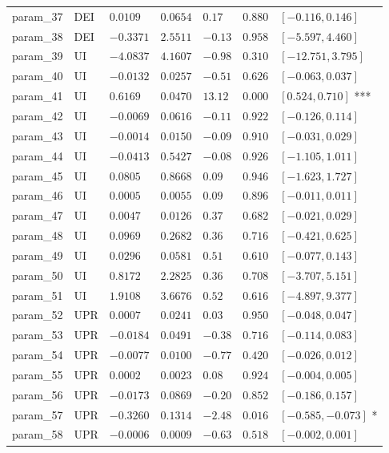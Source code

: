 \documentclass{article}
\begin{document}
\begin{longtable}{lllllll}
param\_37 & DEI & $0.0109$ & $0.0654$ & $0.17$ & $0.880$ & $[-0.116, 0.146]$  \\
param\_38 & DEI & $-0.3371$ & $2.5511$ & $-0.13$ & $0.958$ & $[-5.597, 4.460]$  \\
param\_39 & UI & $-4.0837$ & $4.1607$ & $-0.98$ & $0.310$ & $[-12.751, 3.795]$  \\
param\_40 & UI & $-0.0132$ & $0.0257$ & $-0.51$ & $0.626$ & $[-0.063, 0.037]$  \\
param\_41 & UI & $0.6169$ & $0.0470$ & $13.12$ & $0.000$ & $[0.524, 0.710]$ *** \\
param\_42 & UI & $-0.0069$ & $0.0616$ & $-0.11$ & $0.922$ & $[-0.126, 0.114]$  \\
param\_43 & UI & $-0.0014$ & $0.0150$ & $-0.09$ & $0.910$ & $[-0.031, 0.029]$  \\
param\_44 & UI & $-0.0413$ & $0.5427$ & $-0.08$ & $0.926$ & $[-1.105, 1.011]$  \\
param\_45 & UI & $0.0805$ & $0.8668$ & $0.09$ & $0.946$ & $[-1.623, 1.727]$  \\
param\_46 & UI & $0.0005$ & $0.0055$ & $0.09$ & $0.896$ & $[-0.011, 0.011]$  \\
param\_47 & UI & $0.0047$ & $0.0126$ & $0.37$ & $0.682$ & $[-0.021, 0.029]$  \\
param\_48 & UI & $0.0969$ & $0.2682$ & $0.36$ & $0.716$ & $[-0.421, 0.625]$  \\
param\_49 & UI & $0.0296$ & $0.0581$ & $0.51$ & $0.610$ & $[-0.077, 0.143]$  \\
param\_50 & UI & $0.8172$ & $2.2825$ & $0.36$ & $0.708$ & $[-3.707, 5.151]$  \\
param\_51 & UI & $1.9108$ & $3.6676$ & $0.52$ & $0.616$ & $[-4.897, 9.377]$  \\
param\_52 & UPR & $0.0007$ & $0.0241$ & $0.03$ & $0.950$ & $[-0.048, 0.047]$  \\
param\_53 & UPR & $-0.0184$ & $0.0491$ & $-0.38$ & $0.716$ & $[-0.114, 0.083]$  \\
param\_54 & UPR & $-0.0077$ & $0.0100$ & $-0.77$ & $0.420$ & $[-0.026, 0.012]$  \\
param\_55 & UPR & $0.0002$ & $0.0023$ & $0.08$ & $0.924$ & $[-0.004, 0.005]$  \\
param\_56 & UPR & $-0.0173$ & $0.0869$ & $-0.20$ & $0.852$ & $[-0.186, 0.157]$  \\
param\_57 & UPR & $-0.3260$ & $0.1314$ & $-2.48$ & $0.016$ & $[-0.585, -0.073]$ * \\
param\_58 & UPR & $-0.0006$ & $0.0009$ & $-0.63$ & $0.518$ & $[-0.002, 0.001]$  \\

\end{longtable}
\end{document}
